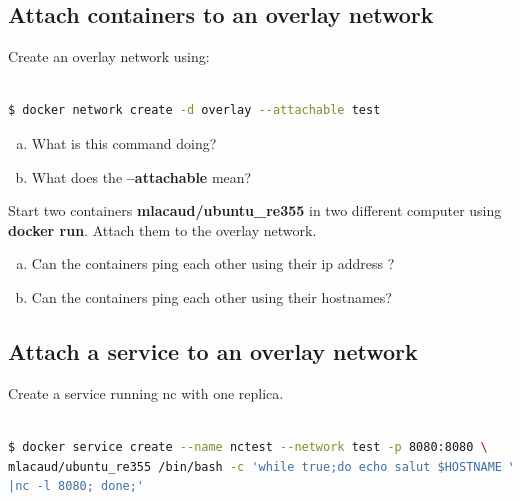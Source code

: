 \documentclass[a4paper,11pt]{exam}
\begin{document}
\subsection{Attach containers to an overlay network}
Create an overlay network using:

\begin{lstlisting}[frame=single,language={sh}]  % Start your code-block

$ docker network create -d overlay --attachable test 
\end{lstlisting}

\begin{questions}
	\question 
	\begin{enumerate}[(a)]
		\item What is this command doing?
		\item What does the \textbf{--attachable} mean?
	\end{enumerate}


Start two containers \textbf{mlacaud/ubuntu\_re355} in two different computer using \textbf{docker run}. Attach them to the overlay network.


	\question 
	\begin{enumerate}[(a)]
		\item Can the containers ping each other using their ip address ?
		\item Can the containers ping each other using their hostnames?
	\end{enumerate}
\end{questions}

\subsection{Attach a service to an overlay network}

Create a service running nc with one replica.

\begin{lstlisting}[frame=single,language={sh}]  % Start your code-block

$ docker service create --name nctest --network test -p 8080:8080 \
mlacaud/ubuntu_re355 /bin/bash -c 'while true;do echo salut $HOSTNAME \
|nc -l 8080; done;'
\end{lstlisting}
\end{document}
